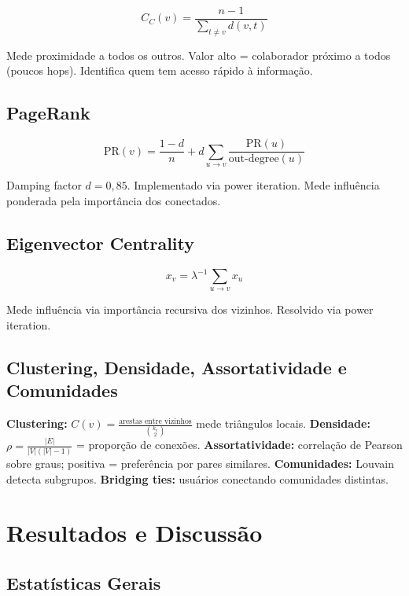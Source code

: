 \documentclass[12pt,a4paper]{article}
\begin{document}
\[
C_C(v) = \frac{n-1}{\sum_{t \neq v} d(v,t)}
\]

Mede proximidade a todos os outros. Valor alto = colaborador próximo a todos (poucos hops). Identifica quem tem acesso rápido à informação.

\subsection{PageRank}

\[
\text{PR}(v) = \frac{1-d}{n} + d \sum_{u \to v} \frac{\text{PR}(u)}{\text{out-degree}(u)}
\]

Damping factor $d = 0{,}85$. Implementado via power iteration. Mede influência ponderada pela importância dos conectados.

\subsection{Eigenvector Centrality}

\[
x_v = \lambda^{-1} \sum_{u \to v} x_u
\]

Mede influência via importância recursiva dos vizinhos. Resolvido via power iteration.

\subsection{Clustering, Densidade, Assortatividade e Comunidades}

\textbf{Clustering:} $C(v) = \frac{\text{arestas entre vizinhos}}{\binom{k_v}{2}}$ mede triângulos locais. \textbf{Densidade:} $\rho = \frac{|E|}{|V|(|V|-1)}$ = proporção de conexões. \textbf{Assortatividade:} correlação de Pearson sobre graus; positiva = preferência por pares similares. \textbf{Comunidades:} Louvain detecta subgrupos. \textbf{Bridging ties:} usuários conectando comunidades distintas.

\section{Resultados e Discussão}\label{sec:resultados}

\subsection{Estatísticas Gerais}
\end{document}
